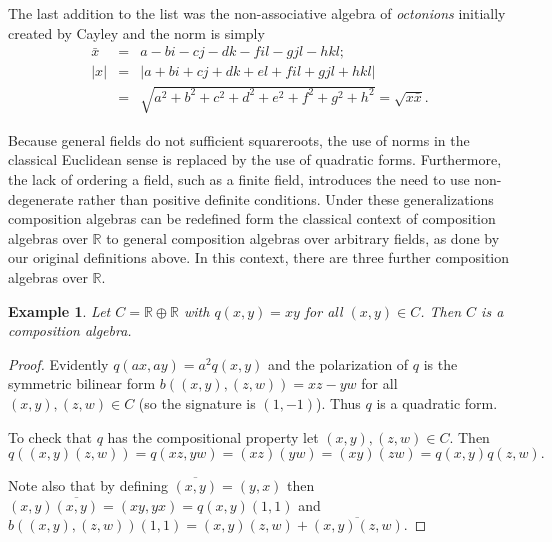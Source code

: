 \documentclass[12pt]{article}
\newtheorem{ex}[thm]{Example}
\begin{document}
The last addition to the list was the non-associative algebra of \emph{octonions}
initially created by Cayley and the norm is simply 
\begin{eqnarray*}
  \bar{x} & = & a-bi-cj-dk-fil-gjl-hkl;\\
  |x|&=&|a+bi+cj+dk+el+fil+gjl+hkl| \\ 
     &=& \sqrt{a^2+b^2+c^2+d^2+e^2+f^2+g^2+h^2}=\sqrt{x\bar{x}}.
\end{eqnarray*}

Because general fields do not sufficient squareroots, the use of norms
in the classical Euclidean sense is replaced by the use of quadratic forms.
Furthermore, the lack of ordering a field, such as a finite field, introduces the
need to use non-degenerate rather than positive definite conditions.  Under these 
generalizations composition algebras can be redefined form the classical context
of composition algebras over $\mathbb{R}$ to general composition algebras over
arbitrary fields, as done by our original definitions above.  In this context, 
there are three further composition algebras over $\mathbb{R}$.

\begin{ex}
Let $C=\mathbb{R}\oplus\mathbb{R}$ with $q(x,y)=xy$ for all
$(x,y)\in C$.  Then $C$ is a composition algebra.
\end{ex}
\begin{proof}
Evidently $q(ax,ay)=a^2 q(x,y)$ and the polarization of $q$ is the symmetric bilinear
form $b((x,y),(z,w))=xz-yw$ for all $(x,y),(z,w)\in C$ (so the signature is $(1,-1)$).
Thus $q$ is a quadratic form.

To check that $q$ has the compositional property let $(x,y),(z,w)\in C$.  Then
\begin{equation*}
q((x,y)(z,w))
    =q(xz,yw)=(xz)(yw)
    =(xy)(zw)
    =q(x,y)q(z,w).
\end{equation*}

Note also that by defining $\overline{(x,y)}=(y,x)$ then $(x,y)\overline{(x,y)}
=(xy,yx)=q(x,y)(1,1)$ and $b((x,y),(z,w))(1,1)=(x,y)(z,w)+\overline{(x,y)(z,w)}$.
\end{proof}
\end{document}

